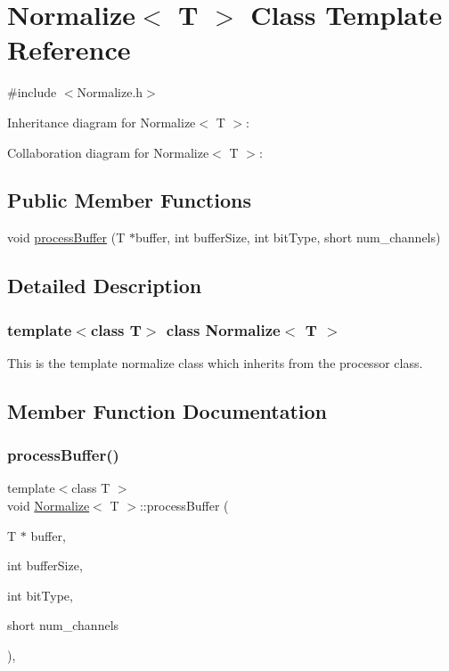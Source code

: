 \hypertarget{classNormalize}{}\section{Normalize$<$ T $>$ Class Template Reference}
\label{classNormalize}


{\ttfamily \#include $<$Normalize.\+h$>$}



Inheritance diagram for Normalize$<$ T $>$\+:


Collaboration diagram for Normalize$<$ T $>$\+:
\subsection*{Public Member Functions}
\begin{DoxyCompactItemize}
\item 
void \hyperlink{classNormalize_a41964a5f116feee301f14403ec8a57ff}{process\+Buffer} (T $\ast$buffer, int buffer\+Size, int bit\+Type, short num\+\_\+channels)
\end{DoxyCompactItemize}


\subsection{Detailed Description}
\subsubsection*{template$<$class T$>$\newline
class Normalize$<$ T $>$}

This is the template normalize class which inherits from the processor class. 

\subsection{Member Function Documentation}
\mbox{\label{classNormalize_a41964a5f116feee301f14403ec8a57ff}} 
\subsubsection{\texorpdfstring{process\+Buffer()}{processBuffer()}}
{\footnotesize\ttfamily template$<$class T $>$ \\
void \hyperlink{classNormalize}{Normalize}$<$ T $>$\+::process\+Buffer (\begin{DoxyParamCaption}\item[{T $\ast$}]{buffer,  }\item[{int}]{buffer\+Size,  }\item[{int}]{bit\+Type,  }\item[{short}]{num\+\_\+channels }\end{DoxyParamCaption})\hspace{0.3cm}{\ttfamily [inline]}, {\ttfamily [virtual]}}

